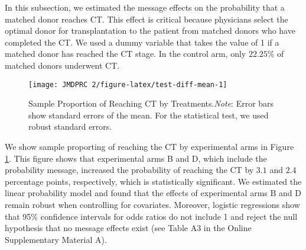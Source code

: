 \documentclass[12pt, a4paper]{article}
\begin{document}
In this subsection, we estimated the message effects on the probability that a matched donor reaches CT. This effect is critical because physicians select the optimal donor for transplantation to the patient from matched donors who have completed the CT. We used a dummy variable that takes the value of 1 if a matched donor has reached the CT stage. In the control arm, only \(22.25\)\% of matched donors underwent CT.

\begin{figure}[t]
\texttt{[image: JMDPRC~2/figure-latex/test-diff-mean-1]} \caption{Sample Proportion of Reaching CT by Treatments.\newline \emph{Note}: Error bars show standard errors of the mean. For the statistical test, we used robust standard errors.}\label{fig:test-diff-mean}
\end{figure}

We show sample proporting of reaching the CT by experimental arms in Figure \ref{fig:test-diff-mean}. This figure shows that experimental arms B and D, which include the probability message, increased the probability of reaching the CT by \(3.1\) and \(2.4\) percentage points, respectively, which is statistically significant. We estimated the linear probability model and found that the effects of experimental arms B and D remain robust when controlling for covariates. Moreover, logistic regressions show that 95\% confidence intervals for odds ratios do not include 1 and reject the null hypothesis that no message effects exist (see Table A3 in the Online Supplementary Material A).
\end{document}
